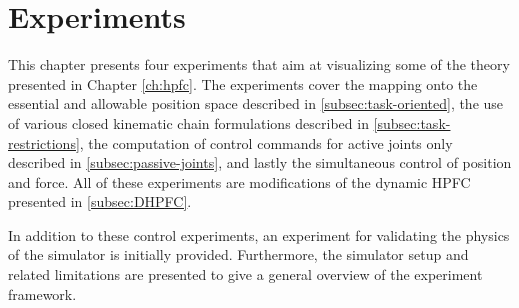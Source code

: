 \chapter{Experiments}\label{ch:results}

This chapter presents four experiments that aim at visualizing some of the theory presented in Chapter \ref{ch:hpfc}. The experiments cover the mapping onto the essential and allowable position space described in \ref{subsec:task-oriented}, the use of various closed kinematic chain formulations described in \ref{subsec:task-restrictions}, the computation of control commands for active joints only described in \ref{subsec:passive-joints}, and lastly the simultaneous control of position and force. All of these experiments are modifications of the dynamic HPFC presented in \ref{subsec:DHPFC}.

In addition to these control experiments, an experiment for validating the physics of the simulator is initially provided. Furthermore, the simulator setup and related limitations are presented to give a general overview of the experiment framework.











